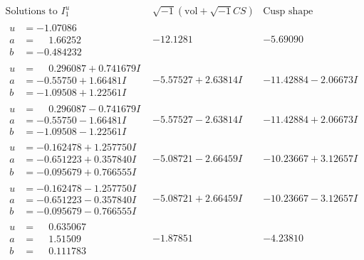 \documentclass[1p]{elsarticle_modified}
\theoremstyle{definition}
\newcommand{\I}{\sqrt{-1}}
\begin{document}
$$\begin{array}{c|c|c}  
\text{Solutions to }I^u_{1}& \I (\text{vol} + \sqrt{-1}CS) & \text{Cusp shape}\\
 \hline 
\begin{aligned}
u &= -1.07086\phantom{ +0.000000I} \\
a &= \phantom{-}1.66252\phantom{ +0.000000I} \\
b &= -0.484232\phantom{ +0.000000I}\end{aligned}
 & -12.1281\phantom{ +0.000000I} & -5.69090\phantom{ +0.000000I} \\ \hline\begin{aligned}
u &= \phantom{-}0.296087 + 0.741679 I \\
a &= -0.55750 + 1.66481 I \\
b &= -1.09508 + 1.22561 I\end{aligned}
 & -5.57527 + 2.63814 I & -11.42884 - 2.06673 I \\ \hline\begin{aligned}
u &= \phantom{-}0.296087 - 0.741679 I \\
a &= -0.55750 - 1.66481 I \\
b &= -1.09508 - 1.22561 I\end{aligned}
 & -5.57527 - 2.63814 I & -11.42884 + 2.06673 I \\ \hline\begin{aligned}
u &= -0.162478 + 1.257750 I \\
a &= -0.651223 + 0.357840 I \\
b &= -0.095679 + 0.766555 I\end{aligned}
 & -5.08721 - 2.66459 I & -10.23667 + 3.12657 I \\ \hline\begin{aligned}
u &= -0.162478 - 1.257750 I \\
a &= -0.651223 - 0.357840 I \\
b &= -0.095679 - 0.766555 I\end{aligned}
 & -5.08721 + 2.66459 I & -10.23667 - 3.12657 I \\ \hline\begin{aligned}
u &= \phantom{-}0.635067\phantom{ +0.000000I} \\
a &= \phantom{-}1.51509\phantom{ +0.000000I} \\
b &= \phantom{-}0.111783\phantom{ +0.000000I}\end{aligned}
 & -1.87851\phantom{ +0.000000I} & -4.23810\phantom{ +0.000000I} \\ \hline\begin{aligned}

\end{aligned}
\end{array}$$
\end{document}
